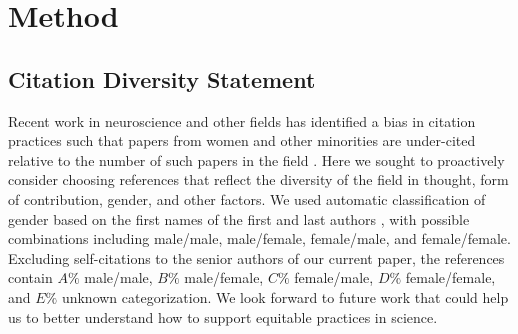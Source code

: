 \documentclass[12pt]{article}
\begin{document}
\section{Method}
\subsection{Citation Diversity Statement}

Recent work in neuroscience and other fields has identified a bias in citation practices such that papers from women and other minorities are under-cited relative to the number of such papers in the field \cite{Dworkin2020.01.03.894378, maliniak2013gender, caplar2017quantitative, chakravartty2018communicationsowhite, YannikThiemKrisF.SealeyAmyE.FerrerAdrielM.Trott2018, dion2018gendered}. Here we sought to proactively consider choosing references that reflect the diversity of the field in thought, form of contribution, gender, and other factors. We used automatic classification of gender based on the first names of the first and last authors \cite{Dworkin2020.01.03.894378, zhou_dale_2020_3672110}, with possible combinations including male/male, male/female, female/male, and female/female. Excluding self-citations to the senior authors of our current paper, the references contain $A\%$ male/male, $B\%$ male/female, $C\%$ female/male, $D\%$ female/female, and $E\%$ unknown categorization. We look forward to future work that could help us to better understand how to support equitable practices in science.

\newpage


\end{document}
